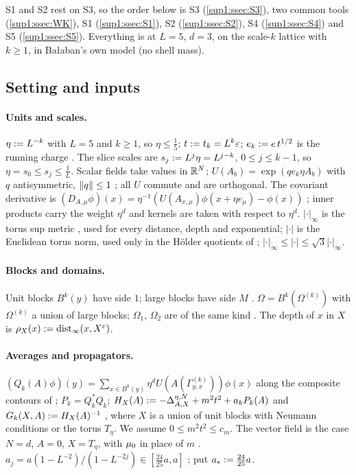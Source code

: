 S1 and S2 rest on S3, so the order below is S3 (\cref{sup1:ssec:S3}), two common tools (\cref{sup1:ssec:WK}), S1 (\cref{sup1:ssec:S1}), S2 (\cref{sup1:ssec:S2}), S4 (\cref{sup1:ssec:S4}) and S5 (\cref{sup1:ssec:S5}). Everything is at $L=5$, $d=3$, on the scale-$k$ lattice with $k\ge1$, in Ba{\l}aban's own model (no shell mass).

\subsection{Setting and inputs}\label{sup1:ssec:setting}

\paragraph{Units and scales.} $\eta:= L^{-k}$ with $L=5$ and $k\ge1$, so $\eta\le\frac15$; $t:= t_k=L^k\varepsilon$; $e_k:= e\,t^{1/2}$ is the running charge \cite[(2.23)]{Ba1}. The slice scales are $s_j:= L^j\eta=L^{j-k}$, $0\le j\le k-1$, so $\eta=s_0\le s_j\le\frac1L$. Scalar fields take values in $\mathbb R^N$; $U(A_b)=\exp(qe_k\eta A_b)$ with $q$ antisymmetric, $\lVert q\rVert\le1$ \cite[p.~605]{Ba1}; all $U$ commute and are orthogonal. The covariant derivative is $(D_{A,\mu}\phi)(x)=\eta^{-1}(U(A_{x,\mu})\phi(x+\eta e_\mu)-\phi(x))$ \cite[(1.7)]{Ba1}; inner products carry the weight $\eta^d$ and kernels are taken with respect to $\eta^d$. $|\cdot|_\infty$ is the torus sup metric \cite[(1.3)]{Ba1}, used for every distance, depth and exponential; $|\cdot|$ is the Euclidean torus norm, used only in the H\"older quotients of \cite[(1.32)]{Ba3}; $|\cdot|_\infty\le|\cdot|\le\sqrt3|\cdot|_\infty$.

\paragraph{Blocks and domains.} Unit blocks $B^k(y)$ have side $1$; large blocks have side $M$ \cite[p.~607]{Ba1}. $\Omega=B^k(\Omega^{(k)})$ with $\Omega^{(k)}$ a union of large blocks; $\Omega_1$, $\Omega_2$ are of the same kind \cite[p.~414]{Ba3}. The depth of $x$ in $X$ is $\rho_X(x):=\operatorname{dist}_\infty(x,X^c)$.

\paragraph{Averages and propagators.} $(Q_k(A)\phi)(y)=\sum_{x\in B^k(y)}\eta^dU(A(\Gamma^{(k)}_{y,x}))\phi(x)$ along the composite contours of \cite[(2.1)--(2.2)]{Ba1}; $P_k=Q_k^*Q_k$; $H_X(A):=-\Delta^{\eta,N}_{A,X}+m^2t^2+a_kP_k(A)$ and $G_k(X,A):= H_X(A)^{-1}$ \cite[(2.22)]{Ba1}, where $X$ is a union of unit blocks with Neumann conditions or the torus $T_\eta$. We assume $0\le m^2t^2\le c_m$. The vector field is the case $N=d$, $A=0$, $X=T_\eta$, with $\mu_0$ in place of $m$ \cite[p.~608]{Ba1}. $a_j=a(1-L^{-2})/(1-L^{-2j})\in[\frac{24}{25}a,a]$ \cite[(2.15)]{Ba1}; put $a_*:=\frac{24}{25}a$.


